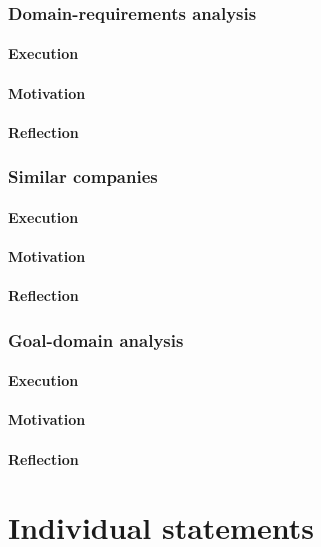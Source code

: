 \documentclass[10pt]{article}
\begin{document}
\subsubsection{Domain-requirements analysis}
\paragraph{Execution}
\paragraph{Motivation}
\paragraph{Reflection}


\subsubsection{Similar companies}
\paragraph{Execution}
\paragraph{Motivation}
\paragraph{Reflection}


\subsubsection{Goal-domain analysis}
\paragraph{Execution}
\paragraph{Motivation}
\paragraph{Reflection}

\section{Individual statements}
\noindent
\end{document}
